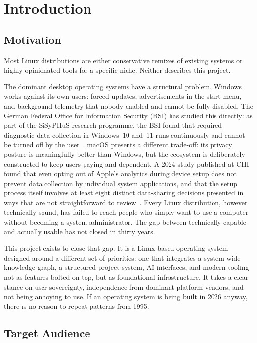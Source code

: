 \section{Introduction}
\label{sec:introduction}

\subsection{Motivation}
\label{sec:motivation}

Most Linux distributions are either conservative remixes of existing systems or
highly opinionated tools for a specific niche. Neither describes this project.

The dominant desktop operating systems have a structural problem. Windows works
against its own users: forced updates, advertisements in the start menu, and
background telemetry that nobody enabled and cannot be fully disabled. The German
Federal Office for Information Security (BSI) has studied this directly: as part
of the SiSyPHuS research programme, the BSI found that required diagnostic data
collection in Windows~10 and~11 runs continuously and cannot be turned off by
the user~\cite{bsi2022sisyphus}. macOS presents a different trade-off: its
privacy posture is meaningfully better than Windows, but the ecosystem is
deliberately constructed to keep users paying and dependent. A 2024 study
published at CHI found that even opting out of Apple's analytics during device
setup does not prevent data collection by individual system applications, and
that the setup process itself involves at least eight distinct data-sharing
decisions presented in ways that are not straightforward to review~\cite{kollnig2024apple}.
Every Linux distribution, however technically sound, has failed to reach people
who simply want to use a computer without becoming a system administrator. The
gap between technically capable and actually usable has not closed in thirty years.

This project exists to close that gap. It is a Linux-based operating system
designed around a different set of priorities: one that integrates a
system-wide knowledge graph, a structured project system, AI interfaces, and
modern tooling not as features bolted on top, but as foundational
infrastructure. It takes a clear stance on user sovereignty, independence from
dominant platform vendors, and not being annoying to use.
If an operating system is being built in 2026 anyway, there is no reason to
repeat patterns from 1995.

\subsection{Target Audience}
\label{sec:audience}

